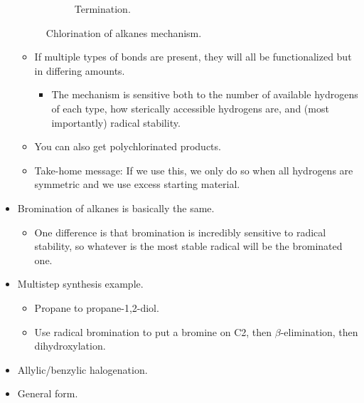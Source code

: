 \documentclass[../notes.tex]{subfiles}
\begin{document}
\begin{itemize}
\begin{figure}[h!]
\begin{subfigure}[b]{\linewidth}
            \schemestop
            \caption{Termination.}
            \label{fig:alkaneChlorinationc}
        \end{subfigure}
        \caption{Chlorination of alkanes mechanism.}
        \label{fig:alkaneChlorination}
    \end{figure}
    \begin{itemize}
        \item If multiple types of  bonds are present, they will all be functionalized but in differing amounts.
        \begin{itemize}
            \item The mechanism is sensitive both to the number of available hydrogens of each type, how sterically accessible hydrogens are, and (most importantly) radical stability.
        \end{itemize}
        \item You can also get polychlorinated products.
        \item Take-home message: If we use this, we only do so when all hydrogens are symmetric and we use excess starting material.
    \end{itemize}
    \item Bromination of alkanes is basically the same.
    \begin{itemize}
        \item One difference is that bromination is incredibly sensitive to radical stability, so whatever is the most stable radical will be the brominated one.
    \end{itemize}
    \item Multistep synthesis example.
    \begin{itemize}
        \item Propane to propane-1,2-diol.
        \item Use radical bromination to put a bromine on C2, then $\beta$-elimination, then dihydroxylation.
    \end{itemize}
    \item Allylic/benzylic halogenation.
    \item General form.

\end{itemize}
\end{document}
